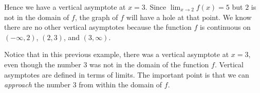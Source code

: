 \documentclass{ximera}
\begin{document}
\begin{example}
\begin{explanation}
\begin{image}
\end{image}
Hence we have a vertical asymptote at $x=3$. Since $\displaystyle \lim_{x\to 2} f(x) = 5$ but $2$ is not in the domain of $f$, the graph of $f$ will have a hole at that point. We know there are no other vertical asymptotes because the function $f$ is continuous on $(-\infty, 2)$, $(2, 3)$, and $(3,\infty)$.
\end{explanation}
\end{example}

Notice that in this previous example, there was a vertical asymptote at $x=3$, even though the number $3$ was not in the domain of the function $f$. 
Vertical asymptotes are defined in terms of limits. The important point is that we can \emph{approach} the number $3$ from within the domain of $f$.
\end{document}

